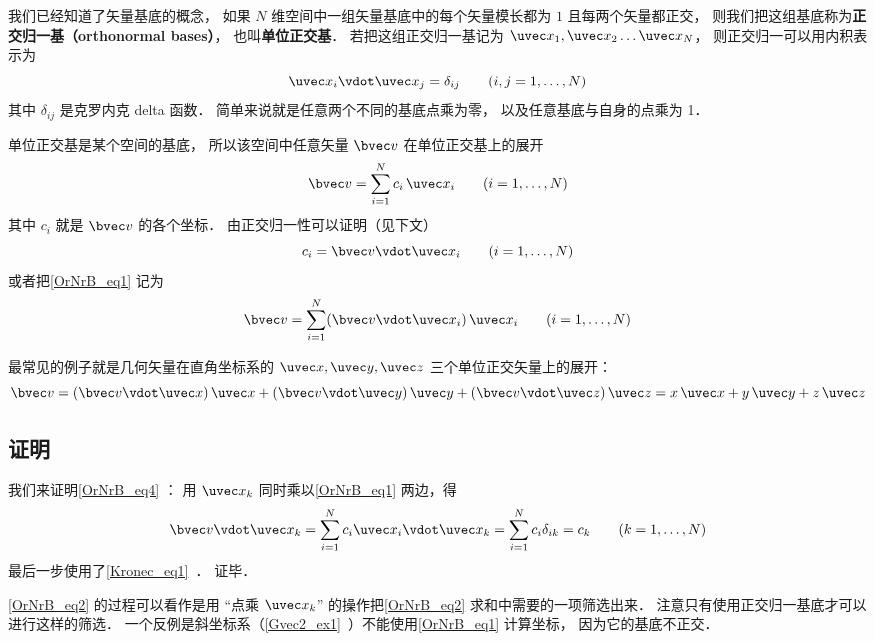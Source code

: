 

我们已经知道了矢量基底的概念， 如果 $N$ 维空间中一组矢量基底中的每个矢量模长都为 $1$ 且每两个矢量都正交， 则我们把这组基底称为\textbf{正交归一基（orthonormal bases）}， 也叫\textbf{单位正交基}． 若把这组正交归一基记为 $\uvec x_1,\uvec x_2\dots\uvec x_N$， 则正交归一可以用内积表示为
\begin{equation}\label{OrNrB_eq3}
\uvec x_i \vdot \uvec x_j = \delta_{ij} \qquad (i,j = 1,\dots, N)
\end{equation}
其中 $\delta_{ij}$ 是克罗内克 delta 函数． 简单来说就是任意两个不同的基底点乘为零， 以及任意基底与自身的点乘为 1．

单位正交基是某个空间的基底， 所以该空间中任意矢量 $\bvec v$ 在单位正交基上的展开
\begin{equation}\label{OrNrB_eq1}
\bvec v = \sum_{i = 1}^N c_i \,\uvec x_i \qquad (i = 1,\dots, N)
\end{equation}
其中 $c_i$ 就是 $\bvec v$ 的各个坐标． 由正交归一性可以证明（见下文）
\begin{equation}\label{OrNrB_eq4}
c_i = \bvec v\vdot\uvec x_i \qquad (i = 1,\dots, N)
\end{equation}
或者把\autoref{OrNrB_eq1} 记为
\begin{equation}\label{OrNrB_eq5}
\bvec v = \sum_{i = 1}^N (\bvec v\vdot\uvec x_i) \,\uvec x_i \qquad (i = 1,\dots, N)
\end{equation}

最常见的例子就是几何矢量在直角坐标系的 $\uvec x, \uvec y, \uvec z$ 三个单位正交矢量上的展开：
\begin{equation}
\bvec v = (\bvec v \vdot \uvec x)\,\uvec x + (\bvec v \vdot \uvec y)\,\uvec y + (\bvec v \vdot \uvec z)\,\uvec z = x \,\uvec x + y \,\uvec y + z \,\uvec z
\end{equation} 

\subsection{证明}
我们来证明\autoref{OrNrB_eq4} ： 用 $\uvec x_k$ 同时乘以\autoref{OrNrB_eq1} 两边，得
\begin{equation}\label{OrNrB_eq2}
\bvec v \vdot \uvec x_k = \sum_{i = 1}^N  c_i \uvec x_i \vdot\uvec x_k = \sum_{i = 1}^N c_i \delta_{ik}  = c_k \qquad (k = 1, \dots, N)
\end{equation}
最后一步使用了\autoref{Kronec_eq1}~． 证毕．

\autoref{OrNrB_eq2} 的过程可以看作是用 “点乘 $\uvec x_k$” 的操作把\autoref{OrNrB_eq2} 求和中需要的一项筛选出来． 注意只有使用正交归一基底才可以进行这样的筛选． 一个反例是斜坐标系（\autoref{Gvec2_ex1}~）不能使用\autoref{OrNrB_eq1} 计算坐标， 因为它的基底不正交．
